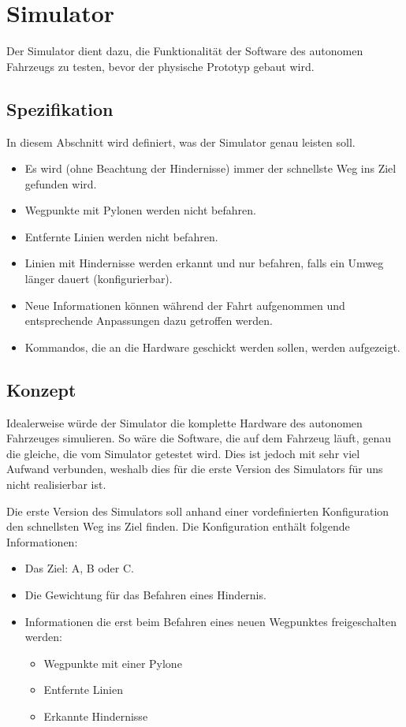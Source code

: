 \documentclass[../main.tex]{subfiles}
\begin{document}
\newpage
\section{Simulator}

Der Simulator dient dazu, die Funktionalität der Software des autonomen Fahrzeugs zu testen, bevor der physische Prototyp gebaut wird.

\subsection{Spezifikation}

In diesem Abschnitt wird definiert, was der Simulator genau leisten soll.

\begin{itemize}
    \item Es wird (ohne Beachtung der Hindernisse) immer der schnellste Weg ins Ziel gefunden wird.
    \item Wegpunkte mit Pylonen werden nicht befahren.
    \item Entfernte Linien werden nicht befahren.
    \item Linien mit Hindernisse werden erkannt und nur befahren, falls ein Umweg länger dauert (konfigurierbar).
    \item Neue Informationen können während der Fahrt aufgenommen und entsprechende Anpassungen dazu getroffen werden.
    \item Kommandos, die an die Hardware geschickt werden sollen, werden aufgezeigt.
\end{itemize}

\subsection{Konzept}

Idealerweise würde der Simulator die komplette Hardware des autonomen Fahrzeuges simulieren. So wäre die Software, die auf dem Fahrzeug läuft, genau die gleiche, die vom Simulator getestet wird. Dies ist jedoch mit sehr viel Aufwand verbunden, weshalb dies für die erste Version des Simulators für uns nicht realisierbar ist.

Die erste Version des Simulators soll anhand einer vordefinierten Konfiguration den schnellsten Weg ins Ziel finden. Die Konfiguration enthält folgende Informationen:
\begin{itemize}
    \item Das Ziel: A, B oder C.
    \item Die Gewichtung für das Befahren eines Hindernis.
    \item Informationen die erst beim Befahren eines neuen Wegpunktes freigeschalten werden:
     \begin{itemize}
        \item{Wegpunkte mit einer Pylone}
        \item{Entfernte Linien}
        \item{Erkannte Hindernisse}
   \end{itemize}
\end{itemize}
\end{document}
